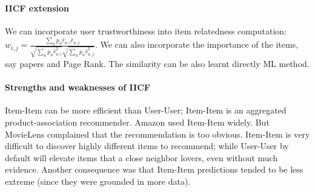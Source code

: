 \documentclass{article}
\theoremstyle{definition}
\begin{document}
\paragraph{IICF extension} We can incorporate user trustworthiness into item relatedness computation: $w_{i,j} = \frac{\sum_u p_u \hat{r}_{u,i} \hat{r}_{u,j}}{ \sqrt{\sum_u p_u \hat{r}_{u,i}^2}\sqrt{\sum_u p_u \hat{r}_{u,j}^2}}$. We can also incorporate the importance of the items, say papers and Page Rank. The similarity can be also learnt directly ML method. 

\paragraph{Strengths and weaknesses of IICF} Item-Item can be more efficient than User-User; Item-Item is an aggregated product-association recommender. Amazon used Item-Item widely. But MovieLens complained that the recommendation is too obvious. Item-Item is very difficult to discover highly different items to recommend; while User-User by default will elevate items that a close neighbor lovers, even without much evidence. Another consequence was that Item-Item predictions tended to be less extreme (since they were grounded in more data).
\end{document}
